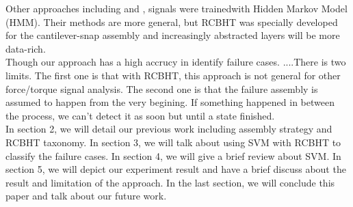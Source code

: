\indent Other approaches including \cite{rodriguez2011abort} and \cite{di2013bayesian}, signals were trainedwith Hidden Markov Model (HMM). Their methods are more general, but RCBHT was specially developed for the cantilever-snap assembly and increasingly abstracted layers will be more data-rich. \\
\indent Though our approach has a high accrucy in identify failure cases. ....There is two limits. The first one is that with RCBHT, this approach is not general for other force/torque signal analysis. The second one is that the failure assembly is assumed to happen from the very begining. If something happened in between the process, we can't detect it as soon but until a state finished. \\
\indent In section 2, we will detail our previous work including assembly strategy and RCBHT taxonomy. In section 3, we will talk about using SVM with RCBHT to classify the failure cases. In section 4, we will give a brief review about SVM. In section 5, we will depict our experiment result and have a brief discuss about the result and limitation of the approach. In the last section, we will conclude this paper and talk about our future work. \\

